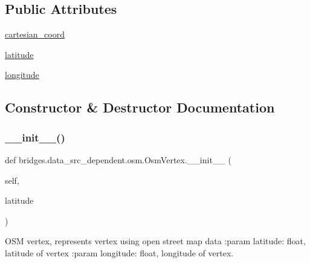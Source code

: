 \subsection*{Public Attributes}
\begin{DoxyCompactItemize}
\item 
\hyperlink{classbridges_1_1data__src__dependent_1_1osm_1_1_osm_vertex_a5f7c71b790312e337d344a311d5b0fae}{cartesian\+\_\+coord}
\item 
\hyperlink{classbridges_1_1data__src__dependent_1_1osm_1_1_osm_vertex_a2b346821c6310d148977b1b6212c4c59}{latitude}
\item 
\hyperlink{classbridges_1_1data__src__dependent_1_1osm_1_1_osm_vertex_a0dd0da0c52e3ca388cf8fbe5f613c273}{longitude}
\end{DoxyCompactItemize}


\subsection{Constructor \& Destructor Documentation}
\mbox{\label{classbridges_1_1data__src__dependent_1_1osm_1_1_osm_vertex_a64fa8f3bfc7df74b5fa93bcc7326e6ac}} 
\subsubsection{\texorpdfstring{\+\_\+\+\_\+init\+\_\+\+\_\+()}{\_\_init\_\_()}}
{\footnotesize\ttfamily def bridges.\+data\+\_\+src\+\_\+dependent.\+osm.\+Osm\+Vertex.\+\_\+\+\_\+init\+\_\+\+\_\+ (\begin{DoxyParamCaption}\item[{}]{self,  }\item[{}]{latitude }\end{DoxyParamCaption})}



O\+SM vertex, represents vertex using open street map data \+:param latitude\+: float, latitude of vertex \+:param longitude\+: float, longitude of vertex. 



